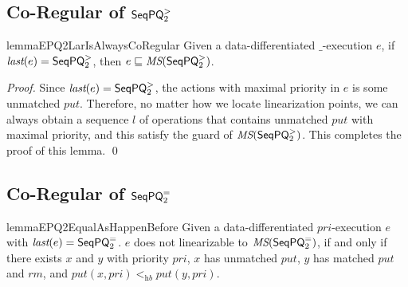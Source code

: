 \subsection{Co-Regular of $\mathsf{SeqPQ}_2^{>}$}
\label{subsec:appendix co-regular of EPQ2Lar}


\begin{restatable}{lemma}{EPQ2LarIsAlwaysCoRegular}
\label{lemma:EPQ2Lar is always co-regular}
Given a data-differentiated $\_$-execution $e$, if $\textit{last}(e) = \mathsf{SeqPQ}_2^{>}$, then $e \sqsubseteq \textit{MS}(\mathsf{SeqPQ}_2^{>})$.
\end{restatable}

\begin {proof}
Since $\textit{last}(e) = \mathsf{SeqPQ}_2^{>}$, the actions with maximal priority in $e$ is some unmatched $\textit{put}$. Therefore, no matter how we locate linearization points, we can always obtain a sequence $l$ of operations that contains unmatched $\textit{put}$ with maximal priority, and this satisfy the guard of $\textit{MS}(\mathsf{SeqPQ}_2^{>})$. This completes the proof of this lemma. \qed
\end {proof}




\subsection{Co-Regular of $\mathsf{SeqPQ}_2^{=}$}
\label{subsec:appendix co-regular of EPQ2Equal}

\begin{restatable}{lemma}{EPQ2EqualAsHappenBefore}
\label{lemma:EPQ2Equal as happen before}
Given a data-differentiated $\textit{pri}$-execution $e$ with $\textit{last}(e) = \mathsf{SeqPQ}_2^{=}$. $e$ does not linearizable to $\textit{MS}(\mathsf{SeqPQ}_2^{=})$, if and only if there exists $x$ and $y$ with priority $\textit{pri}$, $x$ has unmatched $\textit{put}$, $y$ has matched $\textit{put}$ and $\textit{rm}$, and $\textit{put}(x,\textit{pri}) <_{\textit{hb}} \textit{put}(y,\textit{pri})$.
\end{restatable}

